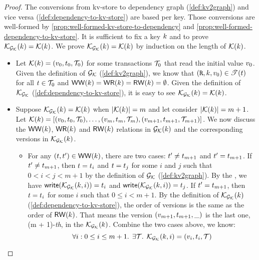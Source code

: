 \begin{proof}
The conversions from kv-store to dependency graph (\cref{def:kv2graph}) and vice versa (\cref{def:dependency-to-kv-store}) are based per key.
Those conversions are well-formed by \cref{prop:well-formed-kv-store-to-dependency} and \cref{prop:well-formed-dependency-to-kv-store}.
It is sufficient to fix a key \( k \) and to prove \( \mathcal{K}_{\mathcal{G}_{\mathcal{K}}}(k) = \mathcal{K}(k) \).
We prove \( \mathcal{K}_{\mathcal{G}_{\mathcal{K}}}(k) = \mathcal{K}(k) \) by induction on the length of \( \mathcal{K}(k) \).

\begin{itemize}
    \item {}
Let \( \mathcal{K}(k) = (v_0, t_0, \mathcal{T}_0 ) \) for some transactions \( \mathcal{T}_0 \) that read the initial value \( v_0 \).
Given the definition of \( \mathcal{G}_{\mathcal{K}} \) (\cref{def:kv2graph}), we know that \( (\texttt{R}, k, v_0 ) \in \mathscr{T}(t) \) for all \( t \in \mathcal{T}_0 \) and \( \mathsf{WW}(k) = \mathsf{WR}(k) = \mathsf{RW}(k) = \emptyset  \).
Given the definition of \( \mathcal{K}_{\mathcal{G}_{\mathcal{K}}}\) (\cref{def:dependency-to-kv-store}), it is easy to see \( \mathcal{K}_{\mathcal{G}_{\mathcal{K}}}(k) = \mathcal{K}(k) \).

    \item {}
Suppose \( \mathcal{K}_{\mathcal{G}_{\mathcal{K}}}(k) = \mathcal{K}(k) \) when \( |\mathcal{K}(k)| = m \) and let consider  \( |\mathcal{K}(k)| = m + 1 \).
Let \( \mathcal{K}(k) = \left[ (v_0, t_0, \mathcal{T}_0 ), \dots, (v_m, t_m, \mathcal{T}_m ), (v_{m+1}, t_{m+1}, \mathcal{T}_{m+1} )  \right] \).
We now discuss the \( \mathsf{WW}(k) \), \( \mathsf{WR}(k) \) and \( \mathsf{RW}(k) \) relations in \( \mathcal{G}_{\mathcal{K}}(k) \) and the corresponding versions in \( \mathcal{K}_{\mathcal{G}_{\mathcal{K}}}(k) \).
\begin{itemize}
    \item For any \( (t, t') \in \mathsf{WW}(k) \), there are two cases: \( t' \neq t_{m+1} \) and \( t' = t_{m+1} \).
    If \( t' \neq t_{m+1} \), then \( t = t_i \) and \( t = t_j \) for some \( i \) and \( j \) such that \( 0 < i < j < m + 1 \) by the definition of \( \mathcal{G}_{\mathcal{K}} \) (\cref{def:kv2graph}).
    By the \ih, we have \( \mathsf{write}(\mathcal{K}_{\mathcal{G}_{\mathcal{K}}}(k,i))  = t_i \) and \( \mathsf{write}(\mathcal{K}_{\mathcal{G}_{\mathcal{K}}}(k,i))  = t_j \).
    If \( t' = t_{m + 1} \), then \( t = t_i \) for some \( i \) such that \( 0 \leq i < m + 1 \).
    By the definition of  \( \mathcal{K}_{\mathcal{G}_{\mathcal{K}}}(k) \) (\cref{def:dependency-to-kv-store}), the order of versions is the same as the order of \( \mathsf{RW}(k) \).
    That means the version \( (v_{m+1}, t_{m+1}, \_ ) \) is the last one, \ie (m + 1)-\emph{th}, in the \( \mathcal{K}_{\mathcal{G}_{\mathcal{K}}}(k) \).
    Combine the two cases above, we know:
    \begin{equation}
        \label{equ:ww-back-to-ww}
        \forall i : 0 \leq i \leq m + 1 \ldotp \; \exists \mathcal{T} \ldotp \; \mathcal{K}_{\mathcal{G}_{\mathcal{K}}}(k, i) = (v_i, t_i, \mathcal{T})
    \end{equation}
    

\end{itemize}
\end{itemize}
\end{proof}
